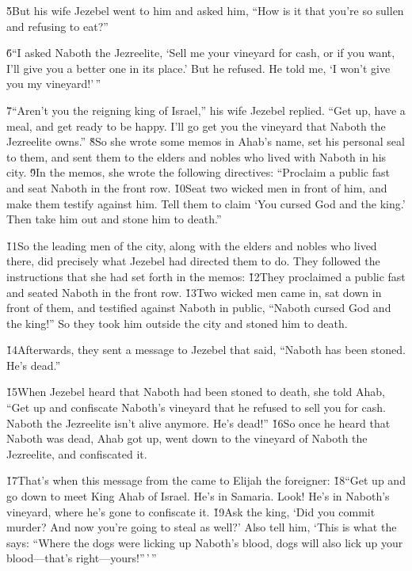 \v{5}But his wife Jezebel went to him and asked him, ``How is it that you're so sullen and refusing to eat?''

\v{6}``I asked Naboth the Jezreelite, `Sell me your vineyard for cash, or if you want, I'll give you a better one in its place.' But he refused. He told me, `I won't give you my vineyard!'\,''

\v{7}``Aren't you the reigning king of Israel,'' his wife Jezebel replied. ``Get up, have a meal, and get ready to be happy. I'll go get you the vineyard that Naboth the Jezreelite owns.'' \v{8}So she wrote some memos in Ahab's name, set his personal seal to them, and sent them to the elders and nobles who lived with Naboth in his city. \v{9}In the memos, she wrote the following directives: ``Proclaim a public fast and seat Naboth in the front row. \v{10}Seat two wicked men in front of him, and make them testify against him. Tell them to claim `You cursed God and the king.' Then take him out and stone him to death.''

\v{11}So the leading men of the city, along with the elders and nobles who lived there, did precisely what Jezebel had directed them to do. They followed the instructions that she had set forth in the memos: \v{12}They proclaimed a public fast and seated Naboth in the front row. \v{13}Two wicked men came in, sat down in front of them, and testified against Naboth in public, ``Naboth cursed God and the king!'' So they took him outside the city and stoned him to death.

\v{14}Afterwards, they sent a message to Jezebel that said, ``Naboth has been stoned. He's dead.''

\v{15}When Jezebel heard that Naboth had been stoned to death, she told Ahab, ``Get up and confiscate Naboth's vineyard that he refused to sell you for cash. Naboth the Jezreelite isn't alive anymore. He's dead!'' \v{16}So once he heard that Naboth was dead, Ahab got up, went down to the vineyard of Naboth the Jezreelite, and confiscated it.

\v{17}That's when this message from the  came to Elijah the foreigner: \v{18}``Get up and go down to meet King Ahab of Israel. He's in Samaria. Look! He's in Naboth's vineyard, where he's gone to confiscate it. \v{19}Ask the king, `Did you commit murder? And now you're going to steal as well?' Also tell him, `This is what the  says: ``Where the dogs were licking up Naboth's blood, dogs will also lick up your blood---that's right---yours!''\,'\,''

